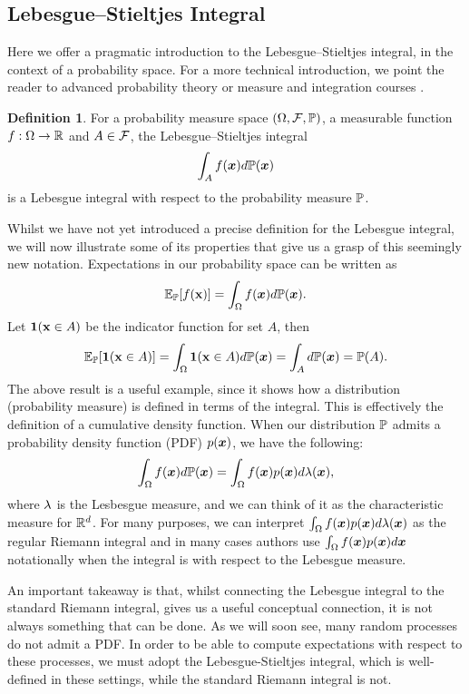 \documentclass[a4paper,12pt,twoside,openright]{report}
\theoremstyle{definition}
\newtheorem{definition}{Definition}[section]
\begin{document}
\subsection{Lebesgue–Stieltjes Integral}
Here we offer a pragmatic introduction to the Lebesgue–Stieltjes integral, in the context of a probability space. For a more technical introduction, we point the reader to advanced probability theory or measure and integration courses \citep{ethmeasure,mitmeasure,cambprob}.
\begin{definition}\label{def:lebesgue}
For a probability measure space $\probspace$, a measurable function $f: \Omega \rightarrow \R $ and $A \in \calF$, the Lebesgue–Stieltjes integral
\begin{align}
    \int_{A} f(\vx) d\P(\vx)
\end{align}
is a Lebesgue integral with respect to the probability measure $\P$.
\end{definition}
Whilst we have not yet introduced a precise definition for the Lebesgue integral, we will now illustrate some of its properties that give us a grasp of this seemingly new notation.
Expectations in our probability space can be written as
\begin{align}
     \E_{\P}[f(\rvx)] = \int_{\Omega} f(\vx) d\P(\vx).
\end{align}
Let $\ind(\rvx \in A)$ be the indicator function for set $A$, then
\begin{align}
    \E_{\P}[\ind(\rvx \in A)] = \int_{\Omega} \ind(\rvx \in A) d\P(\vx) = \int_{A} d\P(\vx) = \P(A).
\end{align}
The above result is a useful example, since it shows how a distribution (probability measure) is defined in terms of the integral. This is effectively  the definition of a cumulative density function.
When our distribution $\P$ admits a probability density function (PDF) $p(\vx)$, we have the following:
\begin{align}
    \int_{\Omega} f(\vx) d\P(\vx) = \int_{\Omega} f(\vx)p(\vx) d\callambda(\vx),
\end{align}
where $\callambda$ is the Lesbesgue measure, and we can think of it as the characteristic measure for $\R^d$. For many purposes, we can interpret $\int_{\Omega} f(\vx)p(\vx) d\callambda(\vx)$ as the regular Riemann integral and in many cases authors \citep{williams2006gaussian} use $\int_{\Omega} f(\vx)p(\vx) d\vx$ notationally when the integral is with respect to the Lebesgue measure.

An important takeaway is that, whilst connecting the Lebesgue integral to the standard Riemann integral, gives us a useful conceptual connection, it is not always something that can be done. As we will soon see, many random processes do not admit a PDF. In order to be able to compute expectations with respect to these processes, we must adopt the Lebesgue-Stieltjes integral, which is well-defined in these settings, while the standard Riemann integral is not.
\end{document}
